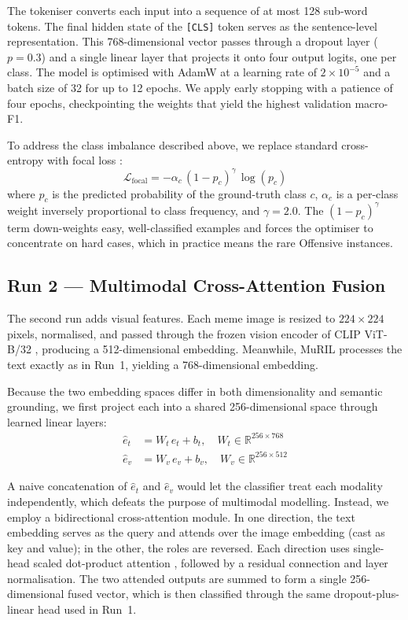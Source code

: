 \documentclass[
]{ceurart}
\begin{document}
The tokeniser converts each input into a sequence of at most 128 sub-word tokens. The final hidden state of the \texttt{[CLS]} token serves as the sentence-level representation. This 768-dimensional vector passes through a dropout layer ($p = 0.3$) and a single linear layer that projects it onto four output logits, one per class. The model is optimised with AdamW at a learning rate of $2 \times 10^{-5}$ and a batch size of 32 for up to 12 epochs. We apply early stopping with a patience of four epochs, checkpointing the weights that yield the highest validation macro-F1.

To address the class imbalance described above, we replace standard cross-entropy with focal loss \cite{lin2017focal}:
\begin{equation}
\mathcal{L}_{\text{focal}} = -\alpha_c\,(1 - p_c)^{\gamma}\,\log(p_c)
\end{equation}
where $p_c$ is the predicted probability of the ground-truth class $c$, $\alpha_c$ is a per-class weight inversely proportional to class frequency, and $\gamma = 2.0$. The $(1 - p_c)^{\gamma}$ term down-weights easy, well-classified examples and forces the optimiser to concentrate on hard cases, which in practice means the rare Offensive instances.

\subsection{Run 2 --- Multimodal Cross-Attention Fusion}

The second run adds visual features. Each meme image is resized to $224 \times 224$ pixels, normalised, and passed through the frozen vision encoder of CLIP ViT-B/32 \cite{radford2021clip}, producing a 512-dimensional embedding. Meanwhile, MuRIL processes the text exactly as in Run~1, yielding a 768-dimensional embedding.

Because the two embedding spaces differ in both dimensionality and semantic grounding, we first project each into a shared 256-dimensional space through learned linear layers:
\begin{align}
\hat{e}_t &= W_t\,e_t + b_t, \quad W_t \in \mathbb{R}^{256 \times 768} \\
\hat{e}_v &= W_v\,e_v + b_v, \quad W_v \in \mathbb{R}^{256 \times 512}
\end{align}

A naive concatenation of $\hat{e}_t$ and $\hat{e}_v$ would let the classifier treat each modality independently, which defeats the purpose of multimodal modelling. Instead, we employ a bidirectional cross-attention module. In one direction, the text embedding serves as the query and attends over the image embedding (cast as key and value); in the other, the roles are reversed. Each direction uses single-head scaled dot-product attention \cite{vaswani2017attention}, followed by a residual connection and layer normalisation. The two attended outputs are summed to form a single 256-dimensional fused vector, which is then classified through the same dropout-plus-linear head used in Run~1.
\end{document}
